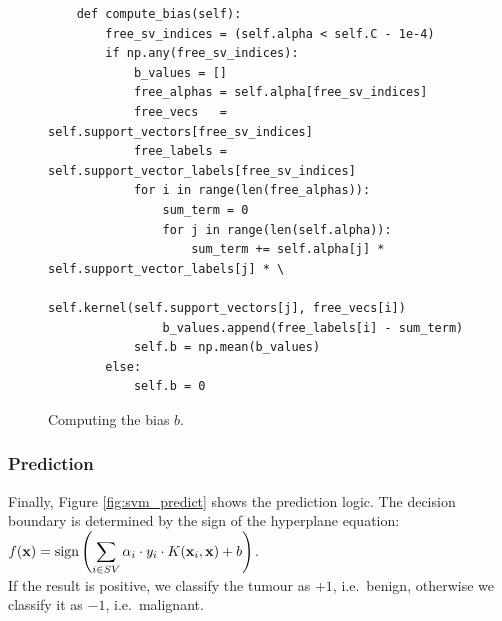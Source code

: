 \begin{figure}[!ht]
\centering
\begin{verbatim}
    def compute_bias(self):
        free_sv_indices = (self.alpha < self.C - 1e-4)
        if np.any(free_sv_indices):
            b_values = []
            free_alphas = self.alpha[free_sv_indices]
            free_vecs   = self.support_vectors[free_sv_indices]
            free_labels = self.support_vector_labels[free_sv_indices]
            for i in range(len(free_alphas)):
                sum_term = 0
                for j in range(len(self.alpha)):
                    sum_term += self.alpha[j] * self.support_vector_labels[j] * \
                                self.kernel(self.support_vectors[j], free_vecs[i])
                b_values.append(free_labels[i] - sum_term)
            self.b = np.mean(b_values)
        else:
            self.b = 0
\end{verbatim}
\caption{Computing the bias $b$.}
\label{fig:svm_bias}
\end{figure}
\FloatBarrier

\subsubsection{Prediction}
Finally, Figure \ref{fig:svm_predict} shows the prediction logic. The decision boundary is determined by the
sign of the hyperplane equation: 
\\[0.2cm]
\hspace*{1.3cm}
$\displaystyle f(\mathbf{x}) = \text{sign}\left( \sum_{i \in SV} \alpha_i \cdot y_i \cdot K(\mathbf{x}_i, \mathbf{x}) + b \right)$.
\\[0.2cm]
If the result is positive, we classify the tumour as $+1$, i.e.~benign, otherwise we classify it as $-1$,
i.e.~malignant. 

